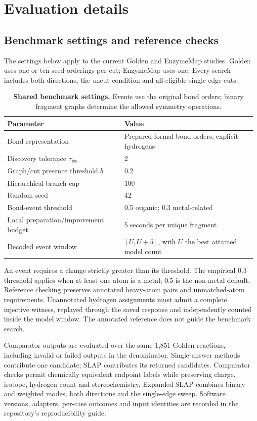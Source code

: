 \section{Evaluation details}
\label{sec:reproducibility}

\subsection{Benchmark settings and reference checks}

The settings below apply to the current Golden and EnzymeMap studies. Golden uses one or ten seed orderings per cut; EnzymeMap uses one. Every search includes both directions, the uncut condition and all eligible single-edge cuts.

\begin{table}[H]
\centering\small
\caption{\textbf{Shared benchmark settings.} Events use the original bond orders; binary fragment graphs determine the allowed symmetry operations.}
\label{tab:benchmark-settings}
\begin{tabular}{ll}\toprule
Parameter & Value\\\midrule
Bond representation & Prepared formal bond orders, explicit hydrogens\\
Discovery tolerance $\tau_{\mathrm{iso}}$ & 2\\
Graph/cut presence threshold $b$ & 0.2\\
Hierarchical branch cap & 100\\
Random seed & 42\\
Bond-event threshold & 0.5 organic; 0.3 metal-related\\
Local preparation/improvement budget & 5 seconds per unique fragment\\
Decoded event window & $[U,U+5]$, with $U$ the best attained model count\\
\bottomrule\end{tabular}
\end{table}

An event requires a change strictly greater than its threshold. The empirical 0.3 threshold applies when at least one atom is a metal; 0.5 is the non-metal default. Reference checking preserves annotated heavy-atom pairs and unmatched-atom requirements. Unannotated hydrogen assignments must admit a complete injective witness, replayed through the saved response and independently counted inside the model window. The annotated reference does not guide the benchmark search.

Comparator outputs are evaluated over the same 1,851 Golden reactions, including invalid or failed outputs in the denominator. Single-answer methods contribute one candidate; SLAP contributes its returned candidates. Comparator checks permit chemically equivalent endpoint labels while preserving charge, isotope, hydrogen count and stereochemistry. Expanded SLAP combines binary and weighted modes, both directions and the single-edge sweep. Software versions, adapters, per-case outcomes and input identities are recorded in the repository's reproducibility guide.

